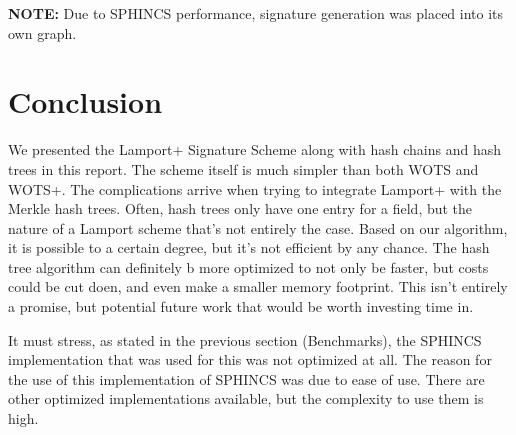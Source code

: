 \documentclass[]{scrartcl}
\begin{document}
\begin{center}
\end{center}


\textbf{NOTE:} Due to SPHINCS performance, signature generation was placed into its own graph.

\section*{Conclusion}
We presented the Lamport+ Signature Scheme along with hash chains and hash trees in this report. The scheme itself is much simpler than both WOTS and WOTS+. The complications arrive when trying to integrate Lamport+ with the Merkle hash trees. Often, hash trees only have one entry for a field, but the nature of a Lamport scheme that's not entirely the case. Based on our algorithm, it is possible to a certain degree, but it's not efficient by any chance. The hash tree algorithm can definitely b more optimized to not only be faster, but costs could be cut doen, and even make a smaller memory footprint. This isn't entirely a promise, but potential future work that would be worth investing time in.

It must stress, as stated in the previous section (Benchmarks), the SPHINCS implementation that was used for this was not optimized at all. The reason for the use of this implementation of SPHINCS was due to ease of use. There are other optimized implementations available, but the complexity to use them is high.
\end{document}
